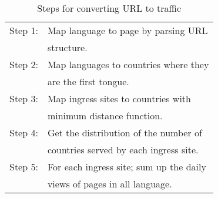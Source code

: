 \begin{table}[!h]
\caption[Steps to convert Raw URL to DC Network Traffic]{Steps for converting URL to traffic} \label{table: url2dc}
\begin{small}
\begin{tabular}{c|l}
\hline \hline
Step 1:& Map language to page by parsing URL \\
&structure. \\
\hline
Step 2:& Map languages to countries where they \\
& are the first tongue. \\ 
\hline
Step 3:& Map ingress sites to countries with \\
& minimum distance function. \\
\hline
Step 4:& Get the distribution of the number of \\
& countries served by each ingress site. \\
\hline
Step 5:& For each ingress site; sum up the daily \\
& views of pages in all language. \\
\hline \hline
\end{tabular}
\end{small}
\end{table}